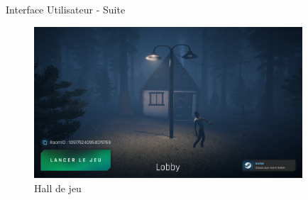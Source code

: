 \begin{frame}{Interface Utilisateur - Suite}

\begin{figure}
    \centering
    \includegraphics[width=10cm]{img/ui/lobby.png}
    \caption{Hall de jeu}
    \label{fig:lobby}
\end{figure}

\end{frame}